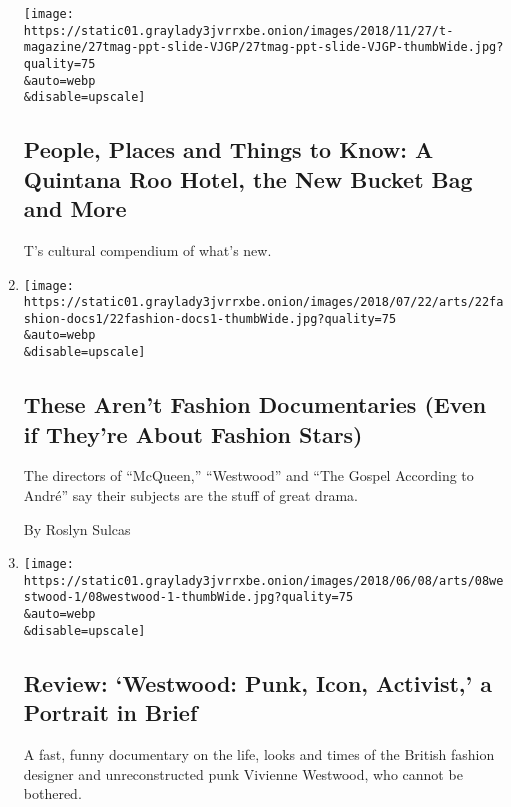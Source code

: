 \begin{enumerate}
  \texttt{[image: https://static01.graylady3jvrrxbe.onion/images/2018/11/27/t-magazine/27tmag-ppt-slide-VJGP/27tmag-ppt-slide-VJGP-thumbWide.jpg?quality=75\\\&auto=webp\\\&disable=upscale]}

  \hypertarget{people-places-and-things-to-know-a-quintana-roo-hotel-the-new-bucket-bag-and-more}{%
  \subsection{People, Places and Things to Know: A Quintana Roo Hotel,
  the New Bucket Bag and
  More}\label{people-places-and-things-to-know-a-quintana-roo-hotel-the-new-bucket-bag-and-more}}

  T's cultural compendium of what's new.
\item
  \href{/2018/07/20/movies/alexander-mcqueen-vivienne-westwood-fashion-movies.html}{}

  \texttt{[image: https://static01.graylady3jvrrxbe.onion/images/2018/07/22/arts/22fashion-docs1/22fashion-docs1-thumbWide.jpg?quality=75\\\&auto=webp\\\&disable=upscale]}

  \hypertarget{these-arent-fashion-documentaries-even-if-theyre-about-fashion-stars}{%
  \subsection{These Aren't Fashion Documentaries (Even if They're About
  Fashion
  Stars)}\label{these-arent-fashion-documentaries-even-if-theyre-about-fashion-stars}}

  The directors of ``McQueen,'' ``Westwood'' and ``The Gospel According
  to André'' say their subjects are the stuff of great drama.

  By Roslyn Sulcas
\item
  \href{/2018/06/07/movies/westwood-punk-icon-activist-review-documentary.html}{}

  \texttt{[image: https://static01.graylady3jvrrxbe.onion/images/2018/06/08/arts/08westwood-1/08westwood-1-thumbWide.jpg?quality=75\\\&auto=webp\\\&disable=upscale]}

  \hypertarget{review-westwood-punk-icon-activist-a-portrait-in-brief}{%
  \subsection{Review: `Westwood: Punk, Icon, Activist,' a Portrait in
  Brief}\label{review-westwood-punk-icon-activist-a-portrait-in-brief}}

  A fast, funny documentary on the life, looks and times of the British
  fashion designer and unreconstructed punk Vivienne Westwood, who
  cannot be bothered.


\end{enumerate}
